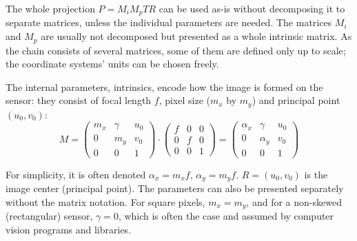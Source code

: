 

The whole projection $P = M_i M_p T R$ can be used as-is without decomposing it to separate matrices, unless the individual parameters are needed.
The matrices $M_i$ and $M_p$ are usually not decomposed but presented as a whole intrinsic matrix.
As the chain consists of several matrices, some of them are defined only up to scale; the coordinate systems' units can be chosen freely.


The internal parameters, intrinsics, encode how the image is formed on the sensor: they consist of focal length $f$, pixel size ($m_x$ by $m_y$) and principal point $(u_0, v_0)$:
\begin{equation}
	M =
	\begin{pmatrix}
		m_x & \gamma & u_0\\
		0   &    m_y & v_0\\
		0   &        0 & 1
	\end{pmatrix}
\cdot
	\begin{pmatrix}
		f & 0 & 0\\
		0 & f & 0\\
		0 & 0 & 1
	\end{pmatrix}
	=
	\begin{pmatrix}
		\alpha_x & \gamma   & u_0\\
		0        & \alpha_y & v_0\\
		0        & 0        & 1
	\end{pmatrix}
\end{equation}

For simplicity, it is often denoted $\alpha_x = m_x f$, $\alpha_y = m_y f$.
$R = (u_0, v_0)$ is the image center (principal point).
The parameters can also be presented separately without the matrix notation.
For square pixels, $m_x = m_y$, and for a non-skewed (rectangular) sensor, $\gamma = 0$, which is often the case and assumed by computer vision programs and libraries. \cite{hartley03multiview,szeliski10vision,heyden2005multiple}


